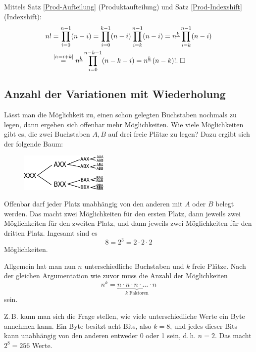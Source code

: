  Mittels Satz \ref{Prod-Aufteilung}
(Produktaufteilung) und  Satz \ref{Prod-Indexshift} (Indexshift):
\begin{align*}
n! &= \prod_{i=0}^{n-1}(n-i)
= \prod_{i=0}^{k-1} (n-i) \prod_{i=k}^{n-1} (n-i)
= n^{\underline k} \prod_{i=k}^{n-1} (n-i)\\
&\stackrel{[i:=i+k]}= n^{\underline k}\prod_{i=0}^{n-k-1} (n-k-i)
= n^{\underline k}\,(n-k)!.\;\Box
\end{align*}

\subsection{Anzahl der Variationen mit Wiederholung}%

Lässt man die Möglichkeit zu, einen schon gelegten Buchstaben
nochmals zu legen, dann ergeben sich offenbar mehr Möglichkeiten.
Wie viele Möglichkeiten gibt es, die zwei Buchstaben $A,B$
auf drei freie Plätze zu legen? Dazu ergibt sich der folgende
Baum:

\begin{figure}[h]
\begin{center}
\includegraphics[width=0.38\textwidth]{img/VariW-XXX-AB.pdf}
\end{center}
\end{figure}

\noindent
Offenbar darf jeder Platz unabhängig von den anderen mit $A$ oder
$B$ belegt werden. Das macht zwei Möglichkeiten für den ersten
Platz, dann jeweils zwei Möglichkeiten für den zweiten Platz,
und dann jeweils zwei Möglichkeiten für den dritten Platz.
Ingesamt sind es
\[8 = 2^3 = 2\cdot 2\cdot 2\]
Möglichkeiten.

Allgemein hat man nun $n$ unterschiedliche Buchstaben und $k$
freie Plätze. Nach der gleichen Argumentation wie zuvor muss die
Anzahl der Möglichkeiten
\[n^k = \underbrace{n\cdot n\cdot n\cdot\ldots\cdot n}_\text{$k$ Faktoren}\]
sein.

Z.\,B. kann man sich die Frage stellen, wie viele unterschiedliche
Werte ein Byte annehmen kann. Ein Byte besitzt acht Bits, also $k=8$,
und jedes dieser Bits kann unabhängig von den anderen entweder 0 oder 1
sein, d.\,h. $n=2$. Das macht $2^8=256$ Werte.
